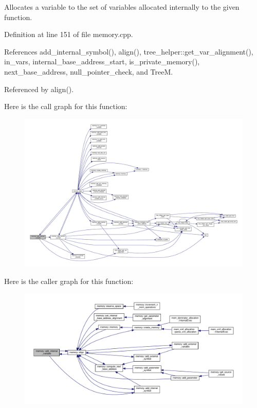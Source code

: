 Allocates a variable to the set of variables allocated internally to the given function. 



Definition at line 151 of file memory.\+cpp.



References add\+\_\+internal\+\_\+symbol(), align(), tree\+\_\+helper\+::get\+\_\+var\+\_\+alignment(), in\+\_\+vars, internal\+\_\+base\+\_\+address\+\_\+start, is\+\_\+private\+\_\+memory(), next\+\_\+base\+\_\+address, null\+\_\+pointer\+\_\+check, and TreeM.



Referenced by align().

Here is the call graph for this function\+:
\nopagebreak
\begin{figure}[H]
\begin{center}
\leavevmode
\includegraphics[width=350pt]{d8/d99/classmemory_a492d9004bff7ff81122a6bb4c2cc6b2d_cgraph}
\end{center}
\end{figure}
Here is the caller graph for this function\+:
\nopagebreak
\begin{figure}[H]
\begin{center}
\leavevmode
\includegraphics[width=350pt]{d8/d99/classmemory_a492d9004bff7ff81122a6bb4c2cc6b2d_icgraph}
\end{center}
\end{figure}
\mbox{\label{classmemory_af1e653b61323d7728656dadf8249a369}} 
